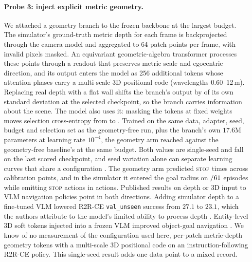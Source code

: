 \paragraph{Probe 3: inject explicit metric geometry.}
We attached a geometry branch to the frozen backbone at the largest budget. The simulator's
ground-truth metric depth for each frame is backprojected through the camera model and aggregated
to 64 patch points per frame, with invalid pixels masked. An equivariant geometric-algebra
transformer processes these points through a readout that preserves metric scale and egocentric
direction, and its output enters the model as 256 additional tokens whose attention phases carry a
multi-scale 3D positional code (wavelengths 0.60--12\,m). Replacing real depth with a flat wall
shifts the branch's output by \PrGeoWall{} of its own standard deviation at the selected checkpoint,
so the branch carries information about the scene. The
model also uses it: masking the tokens at fixed weights moves selection cross-entropy from
\PrGeoMinCE{} to \PrGeoMasked. Trained on the same data, adapter, seed, budget and selection set as
the geometry-free run, plus the branch's own $17.6$M parameters at learning rate $10^{-4}$, the
geometry arm reached \PrGeoMinCE{} against the geometry-free baseline's \PrBigMinCE{} at the same
budget. Both values are single-seed and fall on the last scored checkpoint, and seed variation alone
can separate learning curves that share a configuration \citep{henderson2018matters}. The geometry
arm predicted \textsc{stop} \PrGeoStopTot{} times across \PrGeoPts{} calibration points, and in the
simulator it entered the goal radius on \PrGeoClOracle$/61$ episodes while emitting
\PrGeoClStopActs{} \textsc{stop} actions in \PrGeoClActs{} actions. Published results on depth or 3D
input to VLM navigation policies point in both directions. Adding simulator depth to a fine-tuned
VLM lowered R2R-CE \texttt{val\_unseen} success from $27.1$ to $23.1$, which the authors attribute to
the model's limited ability to process depth \citep{zhang2025mapnav}. Entity-level 3D soft tokens
injected into a frozen VLM improved object-goal navigation \citep{softnav2026}. We know of no
measurement of the configuration used here, per-patch metric-depth geometry tokens with a
multi-scale 3D positional code on an instruction-following R2R-CE policy. This single-seed result
adds one data point to a mixed record.

